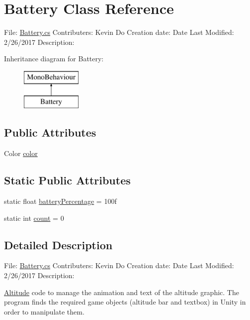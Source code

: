 \hypertarget{class_battery}{}\section{Battery Class Reference}
\label{class_battery}


File\+: \hyperlink{_battery_8cs}{Battery.\+cs} Contributers\+: Kevin Do Creation date\+: Date Last Modified\+: 2/26/2017 Description\+:  


Inheritance diagram for Battery\+:\begin{figure}[H]
\begin{center}
\leavevmode
\includegraphics[height=2.000000cm]{class_battery}
\end{center}
\end{figure}
\subsection*{Public Attributes}
\begin{DoxyCompactItemize}
\item 
Color \hyperlink{class_battery_aefbbc4c5859dbe406f1a62b4e75afb17}{color}
\end{DoxyCompactItemize}
\subsection*{Static Public Attributes}
\begin{DoxyCompactItemize}
\item 
static float \hyperlink{class_battery_accada3fc6604b1021283f4d8021b1a47}{battery\+Percentage} = 100f
\item 
static int \hyperlink{class_battery_a979bd28f1e0c80b77d0de24f3a7c86b2}{count} = 0
\end{DoxyCompactItemize}


\subsection{Detailed Description}
File\+: \hyperlink{_battery_8cs}{Battery.\+cs} Contributers\+: Kevin Do Creation date\+: Date Last Modified\+: 2/26/2017 Description\+: 

\hyperlink{class_altitude}{Altitude} code to manage the animation and text of the altitude graphic. The program finds the required game objects (altitude bar and textbox) in Unity in order to manipulate them.

